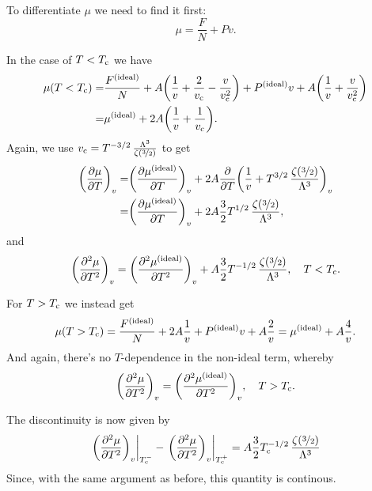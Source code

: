 \documentclass[11pt,letter, swedish, english
]{article}
\begin{document}

\subsubsection{}
To differentiate $\mu$ we need to find it first:
\begin{equation}
\mu=\frac{F}{N}+Pv.
\end{equation}

In the case of $T<T_{\text{c}}$ we have
\begin{equation}
\begin{aligned}
\mu(T<T_{\text{c}})=&\frac{F^\text{{(ideal)}}}{N}
+A\qty(\frac{1}{v}+\frac{2}{v_{\text{c}}}-\frac{v}{v_{\text{c}}^2})
+P^\text{{(ideal)}}v+A\qty(\frac{1}{v}+\frac{v}{v_{\text{c}}^2})\\
=&\mu^\text{{(ideal)}}
+2A\qty(\frac{1}{v}+\frac{1}{v_{\text{c}}}).
\end{aligned}
\end{equation}
Again, we use
$v_{\text{c}}=T^{-3/2}\,\frac{\Lambda^3}{\zeta(\nicefrac{3}{2})}$
to get
\begin{equation}
\begin{aligned}
\qty(\pdv{\mu}{T})_v=&\qty(\pdv{\mu^\text{{(ideal)}}}{T})_v
+2A\pdv{T}\qty(\frac{1}{v}+
T^{3/2}\,\frac{\zeta(\nicefrac{3}{2})}{\Lambda^3})_v\\
=&\qty(\pdv{\mu^\text{{(ideal)}}}{T})_v
+2A\frac{3}{2}
T^{1/2}\,\frac{\zeta(\nicefrac{3}{2})}{\Lambda^3},
\end{aligned}
\end{equation}
and
\begin{equation}
\qty(\pdv[2]{\mu}{T})_v
=\qty(\pdv[2]{\ideal{\mu}}{T})_v
+A\frac{3}{2}
T^{-1/2}\,\frac{\zeta(\nicefrac{3}{2})}{\Lambda^3}
\qcomma T<\Tc.
\end{equation}

For $T>T_{\text{c}}$ we instead get
\begin{equation}
\mu(T>T_{\text{c}})=\frac{F^\text{{(ideal)}}}{N}+2A\frac{1}{v}
+P^\text{{(ideal)}}v+A\frac{2}{v}
=\mu^\text{{(ideal)}}+A\frac{4}{v}.
\end{equation}
And again, there's no $T$-dependence in the non-ideal term, whereby 
\begin{equation}
\qty(\pdv[2]{\mu}{T})_v
=\qty(\pdv[2]{\ideal{\mu}}{T})_v
\qcomma T>\Tc.
\end{equation}

The discontinuity is now given by
\begin{equation}\label{eq:3_discont._mu}
\eval{\qty(\pdv[2]{\mu}{T})_v}_{\Tc^-}
-\eval{\qty(\pdv[2]{\mu}{T})_v}_{\Tc^+}
=A\frac{3}{2}
\Tc^{-1/2}\,\frac{\zeta(\nicefrac{3}{2})}{\Lambda^3}
\end{equation}
Since, with the same argument as before, this quantity is continous.
\end{document}
